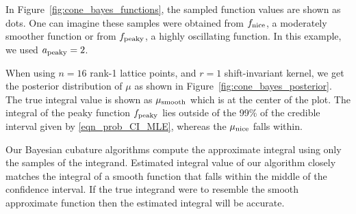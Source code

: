 \documentclass{svjour3}                     %
\newcommand{\bm}[1]{\boldsymbol{#1}}
\newcommand{\vx}{\bm{x}}
\newcommand{\NICE}{\textup{nice}}
\newcommand{\PEAKY}{\textup{peaky}}
\newcommand{\TRUE}{\textup{smooth}}
\newcommand\figref{Figure~\ref}
\begin{document}
In \figref{fig:cone_bayes_functions}, the sampled function values
are shown as dots. One can imagine these samples %
were obtained from $f_{\NICE}$, a moderately smoother function or from $f_{\PEAKY}$, a highly oscillating function. In this example, we used $a_{\PEAKY} = 2$.

When using $n=16$ rank-1 lattice points, and $r=1$ shift-invariant kernel, we get the posterior distribution of $\mu$ as shown in \figref{fig:cone_bayes_posterior}. The true integral value is shown as $\mu_{\TRUE}$ which is at the center of the plot. The integral of the peaky function $f_{\PEAKY}$ lies outside of the 99\% of the credible interval given by \eqref{eqn_prob_CI_MLE}, whereas the $\mu_{\NICE}$ falls within.

Our Bayesian cubature algorithms compute the approximate integral using only the samples of the integrand. 
Estimated integral value of our algorithm closely matches the integral of a smooth function that falls within the middle of the confidence interval. If the true integrand were to resemble the smooth approximate function then the estimated integral will be accurate.  
\end{document}
